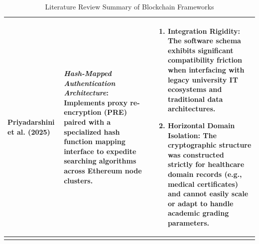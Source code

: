 \begin{longtable}{|m{3.5cm}|m{5cm}|m{5.5cm}|}
    Priyadarshini et al. (2025) \cite{rojalina2025verifichain}                                                                                                                                                                                                             &
    \textit{Hash-Mapped Authentication Architecture}: Implements proxy re-encryption (PRE) paired with a specialized hash function mapping interface to expedite searching algorithms across Ethereum node clusters.                                                       &
    \begin{enumerate}[nosep, leftmargin=*]
        \item Integration Rigidity: The software schema exhibits significant compatibility friction when interfacing with legacy university IT ecosystems and traditional data architectures.
        \item Horizontal Domain Isolation: The cryptographic structure was constructed strictly for healthcare domain records (e.g., medical certificates) and cannot easily scale or adapt to handle academic grading parameters.
    \end{enumerate}                                                \\
    \hline

    \caption{Literature Review Summary of Blockchain Frameworks}
    \label{tab:literature_review}
\end{longtable}